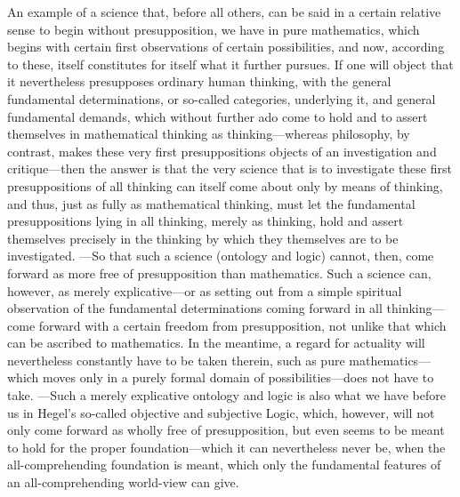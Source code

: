 \documentclass[12pt,a4paper]{book}
\begin{document}
{\small An example of a science that, before all others, can be said in a certain
relative sense to begin without presupposition, we have in pure mathematics, which
begins with certain first observations of certain possibilities, and now, according
to these, itself constitutes for itself what it further pursues. If one will object
that it nevertheless presupposes ordinary human thinking, with the general
fundamental determinations, or so-called categories, underlying it, and general
fundamental demands, which without further ado come to hold and to assert themselves
in mathematical thinking as thinking---whereas philosophy, by contrast, makes these
very first presuppositions objects of an investigation and critique---then the answer
is that the very science that is to investigate these first presuppositions of all
thinking can itself come about only by means of thinking, and thus, just as fully as
mathematical thinking, must let the fundamental presuppositions lying in all thinking,
merely as thinking, hold and assert themselves precisely in the thinking by which they
themselves are to be investigated. ---So that such a science (ontology and logic)
cannot, then, come forward as more free of presupposition than mathematics. Such a
science can, however, as merely explicative---or as setting out from a simple
spiritual observation of the fundamental determinations coming forward in all
thinking---come forward with a certain freedom from presupposition, not unlike that
which can be ascribed to mathematics. In the meantime, a regard for actuality will
nevertheless constantly have to be taken therein, such as pure mathematics---which
moves only in a purely formal domain of possibilities---does not have to take. ---Such
a merely explicative ontology and logic is also what we have before us in Hegel's
so-called objective and subjective Logic, which, however, will not only come forward
as wholly free of presupposition, but even seems to be meant to hold for the proper
foundation---which it can nevertheless never be, when the all-comprehending foundation
is meant, which only the fundamental features of an all-comprehending world-view can
give.\par}
\end{document}
